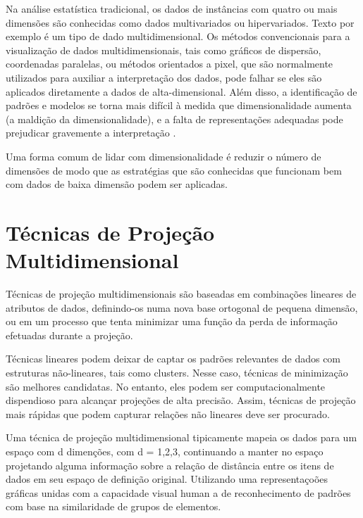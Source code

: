 Na análise estatística tradicional, os dados de instâncias com quatro ou mais dimensões são conhecidas como dados multivariados ou hipervariados. Texto por exemplo é um tipo de dado multidimensional. Os métodos convencionais para a visualização de dados multidimensionais, tais como gráficos de dispersão, coordenadas paralelas, ou métodos orientados a pixel, que são normalmente utilizados para auxiliar a interpretação dos dados, pode falhar se eles são aplicados diretamente a dados de alta-dimensional. Além disso, a identificação de padrões e modelos se torna mais difícil à medida que dimensionalidade aumenta (a maldição da dimensionalidade), e a falta de representações adequadas pode prejudicar gravemente a interpretação \cite{paulovich2008least}.

Uma forma comum de lidar com dimensionalidade é reduzir o número de dimensões de modo que as estratégias que são conhecidas que funcionam bem com dados de baixa dimensão podem ser aplicadas.  



\section{Técnicas de Projeção Multidimensional}

Técnicas de projeção multidimensionais são baseadas em combinações lineares de atributos de dados, definindo-os numa nova base ortogonal de pequena dimensão, ou em um processo que tenta minimizar uma função da perda de informação efetuadas durante a projeção. 

Técnicas lineares podem deixar de captar os padrões relevantes de dados com estruturas não-lineares, tais como clusters. Nesse caso, técnicas de minimização são melhores candidatas. No entanto, eles podem ser computacionalmente dispendioso para alcançar projeções de alta precisão. Assim, técnicas de projeção mais rápidas que podem capturar relações não lineares deve ser procurado.

Uma técnica de projeção multidimensional tipicamente mapeia os dados para um espaço com d dimenções, com d = {1,2,3}, continuando a manter no espaço projetando alguma informação sobre a relação de distância entre os itens de dados em seu espaço de definição original. Utilizando uma representaçoões gráficas unidas com a capacidade visual human
a de reconhecimento de padrões com base na similaridade de grupos de elementos.

